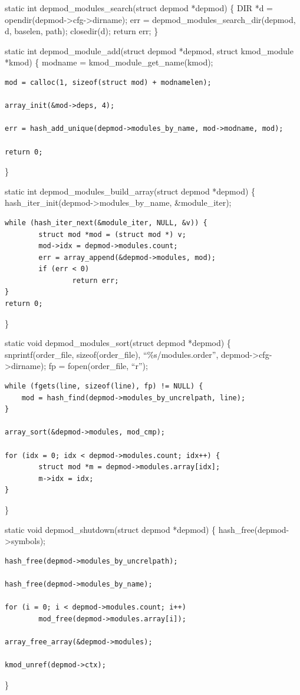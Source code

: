 \documentclass[11pt,a4paper]{article}
\begin{document}
\begin{itemize}
  static int depmod\_modules\_search(struct depmod *depmod) \{ DIR *d =
  opendir(depmod-\textgreater{}cfg-\textgreater{}dirname); err =
  depmod\_modules\_search\_dir(depmod, d, baselen, path); closedir(d);
  return err; \}

  static int depmod\_module\_add(struct depmod *depmod, struct
  kmod\_module *kmod) \{ modname = kmod\_module\_get\_name(kmod);

{\begin{shaded}\begin{verbatim}
mod = calloc(1, sizeof(struct mod) + modnamelen);

array_init(&mod->deps, 4);

err = hash_add_unique(depmod->modules_by_name, mod->modname, mod);

return 0;
\end{verbatim}\end{shaded}}
  \}

  static int depmod\_modules\_build\_array(struct depmod *depmod) \{
  hash\_iter\_init(depmod-\textgreater{}modules\_by\_name,
  \&module\_iter);

{\begin{shaded}\begin{verbatim}
while (hash_iter_next(&module_iter, NULL, &v)) {
        struct mod *mod = (struct mod *) v;
        mod->idx = depmod->modules.count;
        err = array_append(&depmod->modules, mod);
        if (err < 0)
                return err;
}
return 0;
\end{verbatim}\end{shaded}}
  \}

  static void depmod\_modules\_sort(struct depmod *depmod) \{
  snprintf(order\_file, sizeof(order\_file), ``\%s/modules.order'',
  depmod-\textgreater{}cfg-\textgreater{}dirname); fp =
  fopen(order\_file, ``r'');

{\begin{shaded}\begin{verbatim}
while (fgets(line, sizeof(line), fp) != NULL) {
    mod = hash_find(depmod->modules_by_uncrelpath, line);
}

array_sort(&depmod->modules, mod_cmp);

for (idx = 0; idx < depmod->modules.count; idx++) {
        struct mod *m = depmod->modules.array[idx];
        m->idx = idx;
}
\end{verbatim}\end{shaded}}
  \}

  static void depmod\_shutdown(struct depmod *depmod) \{
  hash\_free(depmod-\textgreater{}symbols);

{\begin{shaded}\begin{verbatim}
hash_free(depmod->modules_by_uncrelpath);

hash_free(depmod->modules_by_name);

for (i = 0; i < depmod->modules.count; i++)
        mod_free(depmod->modules.array[i]);

array_free_array(&depmod->modules);

kmod_unref(depmod->ctx);
\end{verbatim}\end{shaded}}
  \}
\end{itemize}
\end{document}
